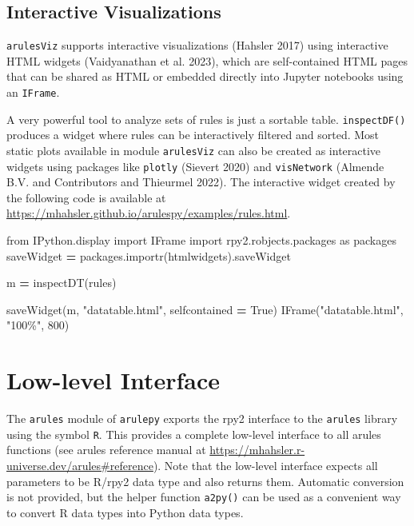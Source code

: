 \documentclass{article}
\newenvironment{Shaded}{\begin{snugshade}}{\end{snugshade}}
\newcommand{\DecValTok}[1]{\textcolor[rgb]{0.00,0.00,0.81}{#1}}
\newcommand{\ImportTok}[1]{#1}
\newcommand{\NormalTok}[1]{#1}
\newcommand{\OperatorTok}[1]{\textcolor[rgb]{0.81,0.36,0.00}{\textbf{#1}}}
\newcommand{\StringTok}[1]{\textcolor[rgb]{0.31,0.60,0.02}{#1}}
\newcommand{\VariableTok}[1]{\textcolor[rgb]{0.00,0.00,0.00}{#1}}
\begin{document}
\hypertarget{interactive-visualizations}{%
\subsection{Interactive
Visualizations}\label{interactive-visualizations}}

\texttt{arulesViz} supports interactive visualizations (Hahsler 2017)
using interactive HTML widgets (Vaidyanathan et al. 2023), which are
self-contained HTML pages that can be shared as HTML or embedded
directly into Jupyter notebooks using an \texttt{IFrame}.

A very powerful tool to analyze sets of rules is just a sortable table.
\texttt{inspectDF()} produces a widget where rules can be interactively
filtered and sorted. Most static plots available in module
\texttt{arulesViz} can also be created as interactive widgets using
packages like \texttt{plotly} (Sievert 2020) and \texttt{visNetwork}
(Almende B.V. and Contributors and Thieurmel 2022). The interactive
widget created by the following code is available at
\url{https://mhahsler.github.io/arulespy/examples/rules.html}.

\begin{Shaded}
\begin{Highlighting}[]
\ImportTok{from}\NormalTok{ IPython.display }\ImportTok{import}\NormalTok{ IFrame}
\ImportTok{import}\NormalTok{ rpy2.robjects.packages }\ImportTok{as}\NormalTok{ packages}
\NormalTok{saveWidget }\OperatorTok{=}\NormalTok{ packages.importr(}\StringTok{\textquotesingle{}htmlwidgets\textquotesingle{}}\NormalTok{).saveWidget}

\NormalTok{m }\OperatorTok{=}\NormalTok{ inspectDT(rules)}

\NormalTok{saveWidget(m, }\StringTok{"datatable.html"}\NormalTok{, selfcontained }\OperatorTok{=} \VariableTok{True}\NormalTok{)}
\NormalTok{IFrame(}\StringTok{"datatable.html"}\NormalTok{, }\StringTok{"100\%"}\NormalTok{, }\DecValTok{800}\NormalTok{)}
\end{Highlighting}
\end{Shaded}

\hypertarget{low-level-interface}{%
\section{Low-level Interface}\label{low-level-interface}}

The \texttt{arules} module of \texttt{arulepy} exports the rpy2
interface to the \texttt{arules} library using the symbol \texttt{R}.
This provides a complete low-level interface to all arules functions
(see arules reference manual at
\url{https://mhahsler.r-universe.dev/arules\#reference}). Note that the
low-level interface expects all parameters to be R/rpy2 data type and
also returns them. Automatic conversion is not provided, but the helper
function \texttt{a2py()} can be used as a convenient way to convert R
data types into Python data types.
\end{document}
